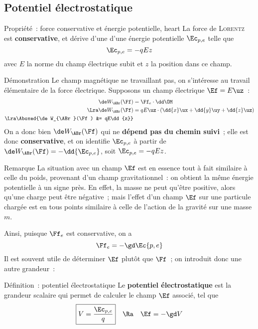 \documentclass[../main/main.tex]{subfiles}
\begin{document}
\subsection{Potentiel électrostatique}
\begin{tprop}{Propriété~: force conservative et énergie potentielle, heart}
    La force de \textsc{Lorentz} est \textbf{conservative}, et dérive d'une
    d'une énergie potentielle $\Ec_{p,e}$ telle que
    \[\Ec_{p,e} = -qEz\]
    avec $E$ la norme du champ électrique subit et $z$ la position dans ce
    champ.
\end{tprop}
\begin{rdemo}{Démonstration}
    Le champ magnétique ne travaillant pas, on s'intéresse au travail
    élémentaire de la force électrique. Supposons un champ électrique $\Ef =
    E\uz$~:
    \begin{align*}
        \de W_{\ABr}(\Ff) &= \Ff_e\cdot\dd\OM
        \\\Lra
        \de W_{\ABr}(\Ff) &= qE\uz\cdot(\dd{x}\ux + \dd{y}\uy + \dd{z}\uz)
        \\\Lra
        \Aboxed{\de W_{\ABr}(\Ff) &= qE\dd{z}}
    \end{align*}
    On a donc bien $\de W_{\ABr}(\Ff)$ qui ne \textbf{dépend pas du chemin
    suivi}~; elle est donc \textbf{conservative}, et on identifie $\Ec_{p,e}$ à
    partir de $\de W_{\ABr}(\Ff) = -\dd{\Ec_{p,e}}$, soit $\Ec_{p,e} = -qEz$.
    \hqed
\end{rdemo}

\begin{rexem}{Remarque}
    La situation avec un champ $\Ef$ est en essence tout à fait similaire à
    celle du poids, provenant d'un champ gravitationnel~: on obtient la même
    énergie potentielle à un signe près. En effet, la masse ne peut qu'être
    positive, alors qu'une charge peut être négative~; mais l'effet d'un champ
    $\Ef$ sur une particule chargée est en tous points similaire à celle de
    l'action de la gravité sur une masse $m$.
\end{rexem}

Ainsi, puisque $\Ff_e$ est conservative, on a
\[\Ff_e = -\gd\Ec{p,e}\]
Il est souvent utile de déterminer $\Ef$ plutôt que $\Ff$~; on introduit donc
une autre grandeur~:

\begin{tdefi}{Définition~: potentiel électrostatique}
    Le \textbf{potentiel électrostatique} est la grandeur scalaire qui permet de
    calculer le champ $\Ef$ associé, tel que
    \[\boxed{V = \frac{\Ec_{p,e}}{q}}
    \quad\Ra\quad
    \Ef = -\gd V\]
\end{tdefi}
\end{document}
